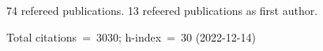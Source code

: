74 refereed publications. 13 refeered publications as first author.

Total citations~=~3030; h-index~=~30 (2022-12-14)